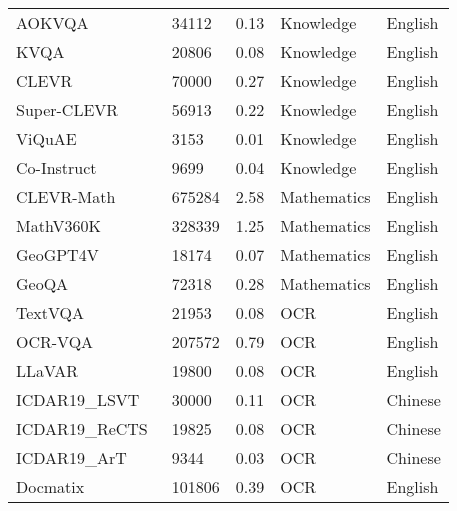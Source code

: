 \begin{table}[h]
\begin{tabular}{l|l|l|l|l}
AOKVQA~\cite{schwenk2022okvqa}                          & 34112   & 0.13     & Knowledge    & English         \\
KVQA~\cite{shah2019kvqa}                            & 20806   & 0.08     & Knowledge    & English         \\
CLEVR~\cite{johnson2017clevr}                           & 70000   & 0.27     & Knowledge    & English         \\
Super-CLEVR~\cite{li2023super}                      & 56913   & 0.22     & Knowledge    & English         \\
ViQuAE~\cite{lerner2022viquae}                          & 3153    & 0.01        & Knowledge    & English         \\
Co-Instruct~\cite{wu2024openended}                     & 9699    & 0.04     & Knowledge    & English         \\
CLEVR-Math~\cite{lindstrom2022clevr}                      & 675284  & 2.58     & Mathematics  & English         \\
MathV360K~\cite{shi2024math}                       & 328339  & 1.25     & Mathematics  & English         \\
GeoGPT4V~\cite{cai2024geogpt4v}                        & 18174   & 0.07     & Mathematics  & English         \\
GeoQA~\cite{chen2022geoqa}                          & 72318   & 0.28     & Mathematics  & English         \\
TextVQA~\cite{singh2019towards}                         & 21953   & 0.08     & OCR          & English         \\
OCR-VQA~\cite{mishra2019ocr}                          & 207572  & 0.79     & OCR          & English         \\
LLaVAR~\cite{zhang2023llavar}                          & 19800   & 0.08     & OCR          & English         \\
ICDAR19\_LSVT~\cite{sun2019icdar}                   & 30000   & 0.11     & OCR          & Chinese         \\
ICDAR19\_ReCTS~\cite{zhang2019icdar}                  & 19825   & 0.08     & OCR          & Chinese         \\
ICDAR19\_ArT~\cite{chng2019icdar2019}                    & 9344    & 0.03     & OCR          & Chinese         \\
Docmatix~\cite{2024docmatrix}                        & 101806  & 0.39     & OCR          & English         \\

\end{tabular}
\end{table}
